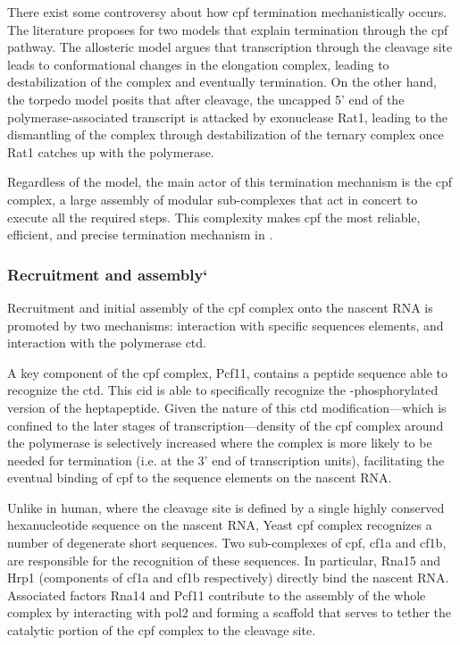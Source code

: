 There exist some controversy about how \gls{cpf} termination mechanistically occurs.
The literature proposes for two models that explain termination through the \gls{cpf} pathway.
The allosteric model argues that transcription through the cleavage site leads to conformational changes in the elongation complex, leading to destabilization of the complex and eventually termination.
On the other hand, the torpedo model posits that after cleavage, the uncapped 5' end of the polymerase-associated transcript is attacked by exonuclease Rat1, leading to the dismantling of the complex through destabilization of the ternary complex once Rat1 catches up with the polymerase.

Regardless of the model, the main actor of this termination mechanism is the \gls{cpf} complex, a large assembly of modular sub-complexes that act in concert to execute all the required steps. 
This complexity makes \gls{cpf} the most reliable, efficient, and precise termination mechanism in \cer{}.

\subsubsection{Recruitment and assembly`}
Recruitment and initial assembly of the \gls{cpf} complex onto the nascent RNA is promoted by two mechanisms: interaction with specific sequences elements, and interaction with the polymerase \gls{ctd}.

A key component of the \gls{cpf} complex, Pcf11, contains a peptide sequence able to recognize the \gls{ctd}. This \gls{cid} is able to specifically recognize the \sert{}-phosphorylated version of the heptapeptide.
Given the nature of this \gls{ctd} modification---which is confined to the later stages of transcription---density of the \gls{cpf} complex around the polymerase is selectively increased where the complex is more likely to be needed for termination (i.e. at the 3' end of transcription units), facilitating the eventual binding of \gls{cpf} to the sequence elements on the nascent RNA.

Unlike in human, where the cleavage site is defined by a single highly conserved hexanucleotide sequence on the nascent RNA, Yeast \gls{cpf} complex recognizes a number of degenerate short sequences.
Two sub-complexes of \gls{cpf}, \gls{cf1a} and \gls{cf1b}, are responsible for the recognition of these sequences.
In particular, Rna15 and Hrp1 (components of \gls{cf1a} and \gls{cf1b} respectively) directly bind the nascent RNA.
Associated factors Rna14 and Pcf11 contribute to the assembly of the whole complex by interacting with \gls{pol2} and forming a scaffold that serves to tether the catalytic portion of the \gls{cpf} complex to the cleavage site.


